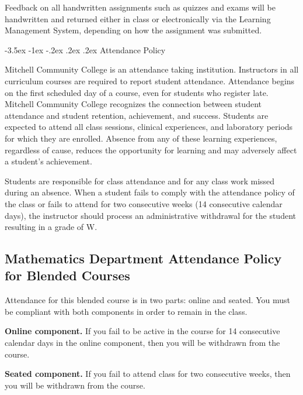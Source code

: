 \documentclass{article}
\makeatletter
\renewcommand\section{\@startsection{section}{1}{0pt}%
  {-3.5ex \@plus -1ex \@minus -.2ex}%
  {.2ex \@plus.2ex}%
  {\normalfont\Large\bfseries}} %
\makeatother
\begin{document}
Feedback on all handwritten assignments such as quizzes and exams will be handwritten and returned either in class or electronically via the Learning Management System, depending on how the assignment was submitted.

\section{Attendance Policy}

Mitchell Community College is an attendance taking institution. Instructors in all curriculum courses are required to report student attendance. Attendance begins on the first scheduled day of a course, even for students who register late. Mitchell Community College recognizes the connection between student attendance and student retention, achievement, and success. Students are expected to attend all class sessions, clinical experiences, and laboratory periods for which they are enrolled. Absence from any of these learning experiences, regardless of cause, reduces the opportunity for learning and may adversely affect a student's achievement.

Students are responsible for class attendance and for any class work missed during an absence. When a student fails to comply with the attendance policy of the class or fails to attend for two consecutive weeks (14 consecutive calendar days), the instructor should process an administrative withdrawal for the student resulting in a grade of W.

\subsection{Mathematics Department Attendance Policy for Blended Courses}

Attendance for this blended course is in two parts: online and seated.  You must be compliant with both components in order to remain in the class.

\textbf{Online component.} If you fail to be active in the course for 14 consecutive calendar days in the online component, then you will be withdrawn from the course.

\textbf{Seated component.} If you fail to attend class for two consecutive weeks, then you will be withdrawn from the course.
\end{document}
